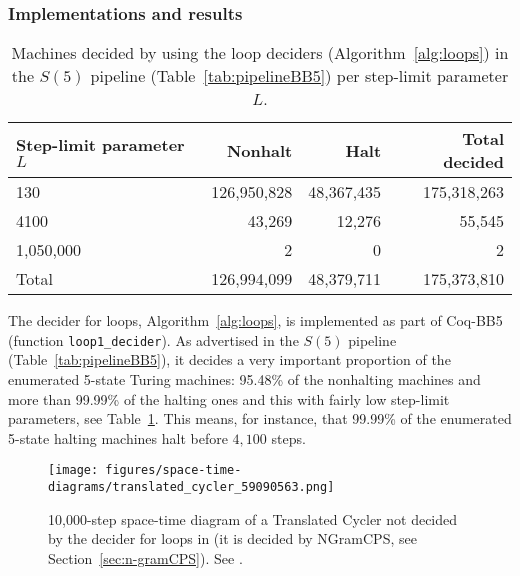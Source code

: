 \subsubsection{Implementations and results}\label{sec:loops:results}

\begin{table}[h!]
  \centering
  \begin{tabular}{|l|rrr|}
    \hline
    Step-limit parameter $L$ & Nonhalt     & Halt       & Total decided \\
    \hline
    130                      & 126,950,828 & 48,367,435 & 175,318,263   \\
    4100                     & 43,269      & 12,276     & 55,545        \\
    1,050,000                & 2           & 0          & 2             \\ \hline
    Total                    & 126,994,099 & 48,379,711 & 175,373,810   \\
    \hline
  \end{tabular}
  \caption{Machines decided by using the loop deciders (Algorithm~\ref{alg:loops}) in the $S(5)$ pipeline (Table~\ref{tab:pipelineBB5}) per step-limit parameter $L$.}\label{tab:paramsLoops}
\end{table}

The decider for loops, Algorithm~\ref{alg:loops}, is implemented as part of Coq-BB5 (function \texttt{loop1\_decider}). As advertised in the $S(5)$ pipeline (Table~\ref{tab:pipelineBB5}), it decides a very important proportion of the enumerated 5-state Turing machines: 95.48\% of the nonhalting machines and more than 99.99\% of the halting ones and this with fairly low step-limit parameters, see Table~\ref{tab:paramsLoops}. This means, for instance, that 99.99\% of the enumerated 5-state halting machines halt before $4,100$ steps.

\begin{figure}
  \centering
  \texttt{[image: figures/space-time-diagrams/translated\_cycler\_59090563.png]}

  \caption{10,000-step space-time diagram of a Translated Cycler not decided by the decider for loops in \CoqBB (it is decided by NGramCPS, see Section~\ref{sec:n-gramCPS}). See .}\label{fig:translated-cyclers-more}
\end{figure}



